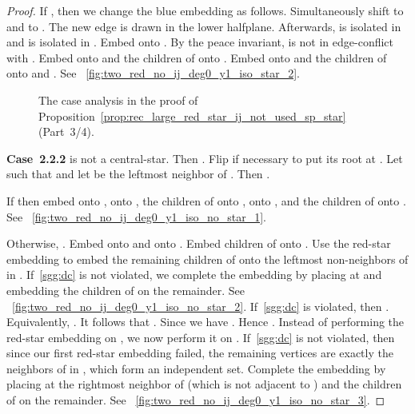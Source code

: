 \documentclass[11pt,a4paper,colorlinks=true,urlcolor=blue,citecolor=red]{article}
\theoremstyle{plain}
\newcommand{\case}[1]{\par\vspace{.5\baselineskip}\noindent\textbf{\sffamily Case~#1}}
\begin{document}
\begin{proof}
  If , then we change the blue embedding as follows.
  Simultaneously shift  to  and  to . The
  new edge  is drawn in the lower halfplane. Afterwards,  is
  isolated in  and  is isolated in . Embed  onto
  . By the peace invariant,  is not in edge-conflict with
  . Embed  onto  and the children of  onto .
  Embed  onto  and the children of  onto  and .
  See \figurename~\ref{fig:two_red_no_ij_deg0_y1_iso_star_2}.

  \begin{figure}
    \centering\hfil {}\hfil {}\hfil {}\hfil {}\hfil \label{fig:two_red_no_ij_3}
    \caption{The case analysis in the proof of
      Proposition~\ref{prop:rec_large_red_star_ij_not_used_sp_star}
      (Part~3/4).}
  \end{figure}


  \case{2.2.2}  is not a central-star. Then
  . Flip  if necessary to put its root
  at . Let  such that  and let  be the
  leftmost neighbor of . Then .

  If  then embed  onto , 
  onto , the children of  onto ,  onto ,
  and the children of  onto . See
  \figurename~\ref{fig:two_red_no_ij_deg0_y1_iso_no_star_1}.

  Otherwise, . Embed  onto  and 
  onto . Embed children of  onto . Use the
  red-star embedding to embed the remaining children of  onto
  the  leftmost non-neighbors of  in
  . If~\ref{sgg:dc} is not violated, we complete the
  embedding by placing  at  and embedding the children of  on
  the remainder. See
  \figurename~\ref{fig:two_red_no_ij_deg0_y1_iso_no_star_2}.
  If~\ref{sgg:dc} is violated, then
  . Equivalently,
  . It follows that
  . Since
   we have . Hence . Instead of performing the red-star embedding on
  , we now perform it on . If~\ref{sgg:dc} is not
  violated, then since our first red-star embedding failed, the
  remaining vertices are exactly the neighbors of  in , which
  form an independent set. Complete the embedding by placing  at the
  rightmost neighbor of  (which is not adjacent to ) and the
  children of  on the remainder. See
  \figurename~\ref{fig:two_red_no_ij_deg0_y1_iso_no_star_3}.


\end{proof}
\end{document}
